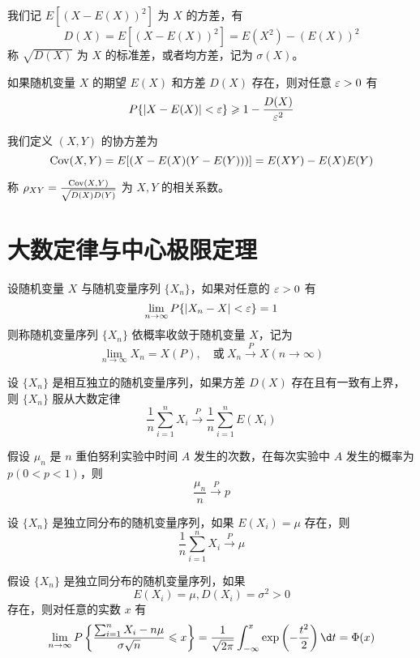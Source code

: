 我们记 $E[(X - E(X))^2]$ 为 $X$ 的方差，有
\[ D(X) = E[(X - E(X))^2] = E(X^2) - (E(X))^2 \]
称 $\sqrt{D(X)}$ 为 $X$ 的标准差，或者均方差，记为 $\sigma(X)$。

\begin{theorem}[切比雪夫不等式]
	如果随机变量 $X$ 的期望 $E(X)$ 和方差 $D(X)$ 存在，则对任意 $\varepsilon > 0$ 有
	\[ P\{|X - E(X)| < \varepsilon\} \geqslant 1 - \frac{D(X)}{\varepsilon^2} \]
\end{theorem}

我们定义 $(X, Y)$ 的协方差为
\[ \operatorname{{Cov}}(X, Y) = E[(X - E(X)(Y - E(Y)))] = E(XY) - E(X) E(Y) \]

称 $\rho_{XY} = \frac{\operatorname{{Cov}}(X, Y)}{\sqrt{D(X) D(Y)}}$ 为 $X, Y$ 的相关系数。

\section{大数定律与中心极限定理}

设随机变量 $X$ 与随机变量序列 $\{X_n\}$，如果对任意的 $\varepsilon > 0$ 有
\[ \lim_{n \to \infty} P\{|X_n - X| < \varepsilon \} =1 \]
则称随机变量序列 $\{X_n\}$ 依概率收敛于随机变量 $X$，记为
\[ \lim_{n \to \infty} X_n = X(P), \quad \text{或}\ X_n \stackrel{P}{\longrightarrow} X(n \to \infty) \]

\begin{theorem}[切比雪夫大数定律]
	设 $\{X_n\}$ 是相互独立的随机变量序列，如果方差 $D(X)$ 存在且有一致有上界，则 $\{X_n\}$ 服从大数定律
	\[ \frac{1}{n} \sum_{i=1}^n X_i \stackrel{P}{\longrightarrow} \frac{1}{n} \sum_{i=1}^n E(X_i) \]
\end{theorem}

\begin{theorem}[伯努利大数定律]
	假设 $\mu_n$ 是 $n$ 重伯努利实验中时间 $A$ 发生的次数，在每次实验中 $A$ 发生的概率为 $p(0 < p < 1)$，则
	\[ \frac{\mu_n}{n} \stackrel{P}{\longrightarrow} p \]
\end{theorem}

\begin{theorem}[辛钦大数定律]
	设 $\{X_n\}$ 是独立同分布的随机变量序列，如果 $E(X_i) = \mu$ 存在，则
	\[ \frac{1}{n} \sum_{i=1}^n X_i \stackrel{P}{\longrightarrow} \mu \]
\end{theorem}

\begin{theorem}[列维 - 林德伯格定理]
	假设 $\{X_n\}$ 是独立同分布的随机变量序列，如果
	\[ E(X_i) = \mu, D(X_i) = \sigma^2 > 0 \]
	存在，则对任意的实数 $x$ 有
	\[ \lim_{n \to \infty} P\left\{ \frac{\sum_{i=1}^n X_i - n \mu}{\sigma \sqrt{n}} \leqslant x \right\} = \frac{1}{\sqrt{2 \pi}} \int_{-\infty}^x \exp\left(-\frac{t^2}{2}\right) \d t = \Phi(x)  \]
\end{theorem}

